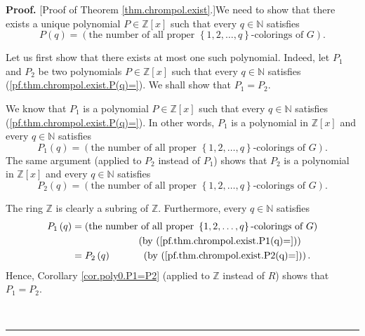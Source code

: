\documentclass[numbers=enddot,12pt,final,onecolumn,notitlepage]{scrartcl}%
\theoremstyle{definition}
\newenvironment{proof}[1][Proof]{\noindent\textbf{#1.} }{\ \rule{0.5em}{0.5em}}
\newenvironment{verlong}{}{}
\begin{document}
\begin{verlong}
\begin{proof}
[Proof of Theorem \ref{thm.chrompol.exist}.]We need to show that there exists
a unique polynomial $P\in\mathbb{Z}\left[  x\right]  $ such that every
$q\in\mathbb{N}$ satisfies%
\begin{equation}
P\left(  q\right)  =\left(  \text{the number of all proper }\left\{
1,2,\ldots,q\right\}  \text{-colorings of }G\right)  .
\label{pf.thm.chrompol.exist.P(q)=}%
\end{equation}


Let us first show that there exists at most one such polynomial. Indeed, let
$P_{1}$ and $P_{2}$ be two polynomials $P\in\mathbb{Z}\left[  x\right]  $ such
that every $q\in\mathbb{N}$ satisfies (\ref{pf.thm.chrompol.exist.P(q)=}). We
shall show that $P_{1}=P_{2}$.

We know that $P_{1}$ is a polynomial $P\in\mathbb{Z}\left[  x\right]  $ such
that every $q\in\mathbb{N}$ satisfies (\ref{pf.thm.chrompol.exist.P(q)=}). In
other words, $P_{1}$ is a polynomial in $\mathbb{Z}\left[  x\right]  $ and
every $q\in\mathbb{N}$ satisfies
\begin{equation}
P_{1}\left(  q\right)  =\left(  \text{the number of all proper }\left\{
1,2,\ldots,q\right\}  \text{-colorings of }G\right)  .
\label{pf.thm.chrompol.exist.P1(q)=}%
\end{equation}
The same argument (applied to $P_{2}$ instead of $P_{1}$) shows that $P_{2}$
is a polynomial in $\mathbb{Z}\left[  x\right]  $ and every $q\in\mathbb{N}$
satisfies
\begin{equation}
P_{2}\left(  q\right)  =\left(  \text{the number of all proper }\left\{
1,2,\ldots,q\right\}  \text{-colorings of }G\right)  .
\label{pf.thm.chrompol.exist.P2(q)=}%
\end{equation}


The ring $\mathbb{Z}$ is clearly a subring of $\mathbb{Z}$. Furthermore, every
$q\in\mathbb{N}$ satisfies%
\begin{align}
P_{1}\left(  q\right)   &  =\left(  \text{the number of all proper }\left\{
1,2,\ldots,q\right\}  \text{-colorings of }G\right) \nonumber\\
&  \ \ \ \ \ \ \ \ \ \ \ \ \ \ \ \ \ \ \ \ \left(  \text{by
(\ref{pf.thm.chrompol.exist.P1(q)=})}\right) \nonumber\\
&  =P_{2}\left(  q\right)  \ \ \ \ \ \ \ \ \ \ \left(  \text{by
(\ref{pf.thm.chrompol.exist.P2(q)=})}\right)  .
\label{pf.thm.chrompol.exist.4}%
\end{align}
Hence, Corollary \ref{cor.poly0.P1=P2} (applied to $\mathbb{Z}$ instead of
$R$) shows that $P_{1}=P_{2}$.


\end{proof}
\end{verlong}
\end{document}
